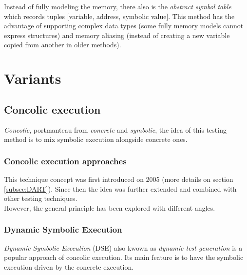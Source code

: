\documentclass[11pt]{IEEEtran}
\begin{document}
        Instead of fully modeling the memory, there also is the \emph{abstract symbol table}~\cite{memorytablemodel} which records tuples [variable, address, symbolic value]. This method has the advantage of supporting complex data types (some fully memory models cannot express structures) and memory aliasing (instead of creating a new variable copied from another in older methods).
  \section{Variants}
    \subsection{Concolic execution}
    \label{subsec:concolicExecution}
    	\emph{Concolic}, portmanteau from \emph{concrete} and \emph{symbolic}, the idea of this testing method is to mix symbolic execution alongside concrete ones.\\

    	\subsubsection*{Concolic execution approaches}
    		This technique concept was first introduced on 2005 \cite{godefroid2005dart} (more details on section \ref{subsec:DART}). %
    	Since then the idea was further extended and combined with other testing techniques.\\

    	However, the general principle has been explored with different angles.

    		\subsubsection{Dynamic Symbolic Execution}
    		\label{subsec:dynamicSymbolicExec}
    			\emph{Dynamic Symbolic Execution} (DSE) also kwown as \emph{dynamic test generation} \cite{godefroid2005dart} is a popular approach of concolic execution. Its main feature is to have the symbolic execution driven by  the concrete execution.\\
\end{document}
